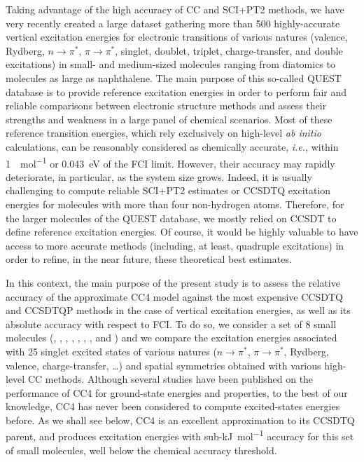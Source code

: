 \documentclass[aip,jcp,reprint,noshowkeys,superscriptaddress]{revtex4-1}
\newcommand{\ie}{\textit{i.e.}}
\newcommand{\npis}{n \to \pi^*}
\newcommand{\pipis}{\pi \to \pi^*}
\begin{document}
Taking advantage of the high accuracy of CC and SCI+PT2 methods, we have very recently created a large dataset gathering more than 500 highly-accurate vertical excitation energies for electronic transitions of various natures (valence, Rydberg, $\npis$, $\pipis$, singlet, doublet, triplet, charge-transfer, and double excitations) in small- and medium-sized molecules ranging from diatomics to molecules as large as naphthalene. 
The main purpose of this so-called QUEST database is to provide reference excitation energies in order to perform fair and reliable comparisons between electronic structure methods and assess their strengths and weakness in a large panel of chemical scenarios.
Most of these reference transition energies, which rely exclusively on high-level \textit{ab initio} calculations, can be reasonably considered as chemically accurate, \ie, within \SI{1}{\kcal\per\mol} or \SI{0.043}{\eV} of the FCI limit.
However, their accuracy may rapidly deteriorate, in particular, as the system size grows.
Indeed, it is usually challenging to compute reliable SCI+PT2 estimates or CCSDTQ excitation energies for molecules with more than four non-hydrogen atoms.
Therefore, for the larger molecules of the QUEST database, we mostly relied on CCSDT to define reference excitation energies.
Of course, it would be highly valuable to have access to more accurate methods (including, at least, quadruple excitations) in order to refine, in the near future, these theoretical best estimates.

In this context, the main purpose of the present study is to assess the relative accuracy of the approximate CC4 model against the most expensive CCSDTQ and CCSDTQP methods in the case of vertical excitation energies, as well as its absolute accuracy with respect to FCI.
To do so, we consider a set of 8 small molecules (, , , , , , , and ) and we compare the excitation energies associated with 25 singlet excited states of various natures ($\npis$, $\pipis$, Rydberg, valence, charge-transfer, \ldots) and spatial symmetries obtained with various high-level CC methods.
Although several studies have been published on the performance of CC4 for ground-state energies and properties, to the best of our knowledge, CC4 has never been considered to compute excited-states energies before.
As we shall see below, CC4 is an excellent approximation to its CCSDTQ parent, and produces excitation energies with sub-\si{\kJ\per\mol} accuracy for this set of small molecules, well below the chemical accuracy threshold.
\end{document}
